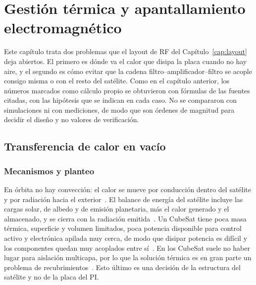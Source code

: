 \chapter{Gestión térmica y apantallamiento electromagnético}\label{cap:termica-emi}

Este capítulo trata dos problemas que el layout de RF del Capítulo~\ref{cap:layout} deja abiertos. El primero es dónde va el calor que disipa la placa cuando no hay aire, y el segundo es cómo evitar que la cadena filtro--amplificador--filtro se acople consigo misma o con el resto del satélite. Como en el capítulo anterior, los números marcados como cálculo propio se obtuvieron con fórmulas de las fuentes citadas, con las hipótesis que se indican en cada caso. No se compararon con simulaciones ni con mediciones, de modo que son órdenes de magnitud para decidir el diseño y no valores de verificación.


\section{Transferencia de calor en vacío}\label{sec:termica}

\subsection{Mecanismos y planteo}\label{sec:termica-mecanismos}

En órbita no hay convección: el calor se mueve por conducción dentro del satélite y por radiación hacia el exterior~\cite{nasasoa}. El balance de energía del satélite incluye las cargas solar, de albedo y de emisión planetaria, más el calor generado y el almacenado, y se cierra con la radiación emitida~\cite{nasasoa}. Un CubeSat tiene poca masa térmica, superficie y volumen limitados, poca potencia disponible para control activo y electrónica apilada muy cerca, de modo que disipar potencia es difícil y los componentes quedan muy acoplados entre sí~\cite{nasasoa}. En los CubeSat suele no haber lugar para aislación multicapa, por lo que la solución térmica es en gran parte un problema de recubrimientos~\cite{nasasoa}. Esto último es una decisión de la estructura del satélite y no de la placa del PI\@.

